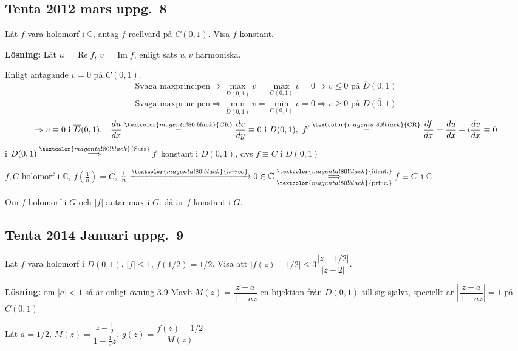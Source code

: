 \subsection{Tenta 2012 mars uppg.\ 8}
Låt $f$ vara holomorf i $\mathbb{C}$, antag $f$ reellvärd på $C(0, 1)$. Visa $f$ konstant.

\textbf{Lösning:} Låt $u = \operatorname{Re} f$, $v = \operatorname{Im} f$, enligt sats $u, v$ harmoniska.

Enligt antagande $v = 0$ på $C(0, 1)$.
\[ \text{Svaga maxprincipen} \Longrightarrow \max_{\overline{D}(0, 1)} v = \max_{C(0, 1)} v = 0 \Rightarrow v \le 0 \text{ på } \overline{D}(0, 1) \]
\[ \text{Svaga maxprincipen} \Longrightarrow \min_{\overline{D}(0, 1)} v = \min_{C(0, 1)} v = 0 \Rightarrow v \ge 0 \text{ på } \overline{D(0, 1)} \]
\[ \Rightarrow v \equiv 0 \text{ i } \overline{D}(0, 1). \quad \frac{du}{dx} \overset{\textcolor{magenta!80!black}{\text{CR}}}{=} \frac{dv}{dy} \equiv 0 \text{ i } D(0, 1),\ f' \overset{\textcolor{magenta!80!black}{\text{CR}}}{=} \frac{df}{dx} = \frac{du}{dx} + i\frac{dv}{dx} \equiv 0 \]
i $D(0, 1) \overset{\textcolor{magenta!80!black}{\text{Sats}}}{\Longrightarrow} f$ konstant i $D(0, 1)$, dvs $f \equiv C$ i $D(0, 1)$

$f, C$ holomorf i $\mathbb{C}$, $f(\frac{1}{n}) = C$, $\frac{1}{n} \xrightarrow{\textcolor{magenta!80!black}{n \to \infty}} 0 \in \mathbb{C} \underset{\textcolor{magenta!80!black}{\text{princ.}}}{\overset{\textcolor{magenta!80!black}{\text{ident.}}}{\Longrightarrow}} f \equiv C$ i $\mathbb{C}$

\begin{theorem}
Om $f$ holomorf i $G$ och $|f|$ antar max i $G$. då är $f$ konstant i $G$.
\end{theorem}

\subsection{Tenta 2014 Januari uppg.\ 9}
Låt $f$ vara holomorf i $D(0, 1)$, $|f| \le 1$, $f(1/2) = 1/2$. Visa att $|f(z) - 1/2| \le 3\dfrac{|z - 1/2|}{|z - 2|}$.

\textbf{Lösning:} om $|a| < 1$ så är enligt övning 3.9 Mavb $M(z) = \dfrac{z - a}{1 - \bar{a}z}$ en bijektion från $D(0, 1)$ till sig självt, speciellt är $\left| \dfrac{z - a}{1 - \bar{a}z} \right| = 1$ på $C(0, 1)$

Låt $a = 1/2$, $M(z) = \dfrac{z - \frac{1}{2}}{1 - \frac{1}{2}z}$, $g(z) = \dfrac{f(z) - 1/2}{M(z)}$

